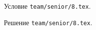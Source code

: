 \problem
Условие \texttt{team/senior/8.tex}.

\solution Решение \texttt{team/senior/8.tex}.
\endproblem
